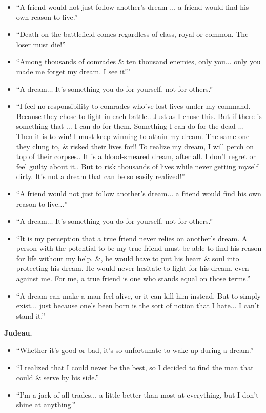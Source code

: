 \documentclass{article}
\begin{document}
\begin{enumerate}
\begin{itemize}
		\item ``A friend would not just follow another's dream $\ldots$  a friend would find his own reason to live.''
		\item ``Death on the battlefield comes regardless of class, royal or common. The loser must die!''
		\item ``Among thousands of comrades \& ten thousand enemies, only you$\ldots$ only you made me forget my dream. I see it!''
		\item ``A dream$\ldots$ It's something you do for yourself, not for others.''
		\item ``I feel no responsibility to comrades who've lost lives under my command. Because they chose to fight in each battle.. Just as I chose this. But if there is something that $\ldots$  I can do for them. Something I can do for the dead $\ldots$  Then it is to win! I must keep winning to attain my dream. The same one they clung to, \& risked their lives for!! To realize my dream, I will perch on top of their corpses.. It is a blood-smeared dream, after all. I don't regret or feel guilty about it.. But to risk thousands of lives while never getting myself dirty. It's not a dream that can be so easily realized!''
		\item ``A friend would not just follow another's dream$\ldots$ a friend would find his own reason to live$\ldots$''
		\item ``A dream$\ldots$ It's something you do for yourself, not for others.''
		\item ``It is my perception that a true friend never relies on another's dream. A person with the potential to be my true friend must be able to find his reason for life without my help. \&, he would have to put his heart \& soul into protecting his dream. He would never hesitate to fight for his dream, even against me. For me, a true friend is one who stands equal on those terms.''
		\item ``A dream can make a man feel alive, or it can kill him instead. But to simply exist$\ldots$ just because one's been born is the sort of notion that I hate$\ldots$ I can't stand it.''
	\end{itemize}
	{\bf Judeau.}
	\begin{itemize}
		\item ``Whether it's good or bad, it's so unfortunate to wake up during a dream.''
		\item ``I realized that I could never be the best, so I decided to find the man that could \& serve by his side.''
		\item ``I'm a jack of all trades$\ldots$ a little better than most at everything, but I don't shine at anything.''

\end{itemize}
\end{enumerate}
\end{document}
